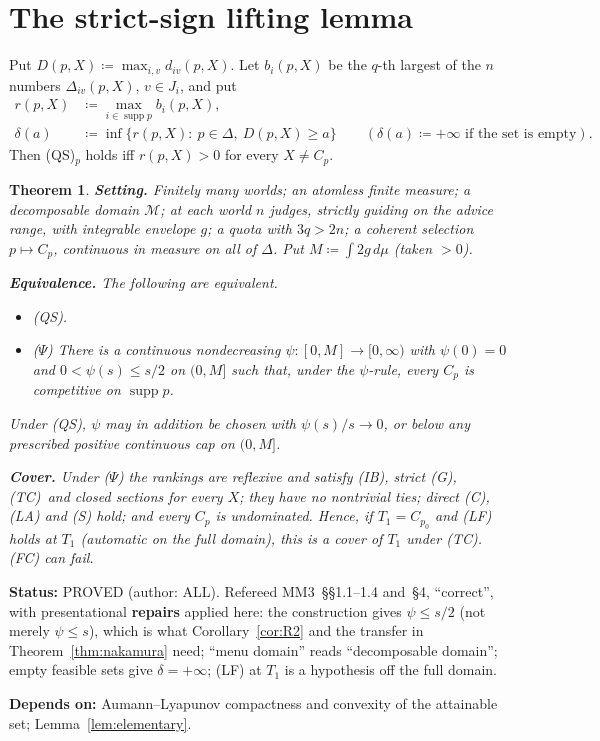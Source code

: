 \documentclass[11pt]{article}
\newtheorem{theorem}{Theorem}[section]
\theoremstyle{definition}
\theoremstyle{remark}
\newcommand{\M}{\mathcal M}
\newcommand{\supp}{\operatorname{supp}}
\newcommand{\src}[1]{\textsf{#1}}
\newcommand{\status}[1]{\par\smallskip\noindent\textbf{Status:} #1\par}
\newcommand{\deps}[1]{\noindent\textbf{Depends on:} #1\par}
\newcommand{\QS}{\textup{(QS)}}
\newcommand{\TC}{\textup{(TC)}}
\begin{document}
\section{The strict-sign lifting lemma}\label{sec:lifting}

Put $D(p,X)\coloneqq\max_{i,v}d_{iv}(p,X)$. Let $b_i(p,X)$ be the $q$-th largest of the $n$ numbers $\Delta_{iv}(p,X)$, $v\in J_i$, and put
\begin{align*}
r(p,X)&\coloneqq\max_{i\in\supp p}b_i(p,X),\\
\delta(a)&\coloneqq\inf\{r(p,X):\ p\in\Delta,\ D(p,X)\ge a\}\qquad(\delta(a)\coloneqq+\infty\text{ if the set is empty}).
\end{align*}
Then \QS$_p$ holds iff $r(p,X)>0$ for every $X\ne C_p$.

\begin{theorem}\label{thm:lifting}
\textbf{Setting.} Finitely many worlds; an atomless finite measure; a decomposable domain $\M$; at each world $n$ judges, strictly guiding on the advice range, with integrable envelope $g$; a quota with $3q>2n$; a coherent selection $p\mapsto C_p$, continuous in measure on all of $\Delta$. Put $M\coloneqq\int2g\,d\mu$ (taken $>0$).

\textbf{Equivalence.} The following are equivalent.
\begin{itemize}[leftmargin=*]
\item \QS.
\item (\(\Psi\)) There is a continuous nondecreasing $\psi:[0,M]\to[0,\infty)$ with $\psi(0)=0$ and $0<\psi(s)\le s/2$ on $(0,M]$ such that, under the $\psi$-rule, every $C_p$ is competitive on $\supp p$.
\end{itemize}
Under \QS, $\psi$ may in addition be chosen with $\psi(s)/s\to0$, or below any prescribed positive continuous cap on $(0,M]$.

\textbf{Cover.} Under (\(\Psi\)) the rankings are reflexive and satisfy (IB), strict (G), \TC\ and closed sections for every $X$; they have no nontrivial ties; direct (C), (LA) and (S) hold; and every $C_p$ is undominated. Hence, if $T_1=C_{p_0}$ and (LF) holds at $T_1$ (automatic on the full domain), this is a cover of $T_1$ under \TC. (FC) can fail.
\end{theorem}
\status{PROVED (author: \src{ALL}). Refereed \src{MM3}~\S\S1.1--1.4 and~\S4, ``correct'', with presentational \textbf{repairs} applied here: the construction gives $\psi\le s/2$ (not merely $\psi\le s$), which is what Corollary~\ref{cor:R2} and the transfer in Theorem~\ref{thm:nakamura} need; ``menu domain'' reads ``decomposable domain''; empty feasible sets give $\delta=+\infty$; (LF) at $T_1$ is a hypothesis off the full domain.}
\deps{Aumann--Lyapunov compactness and convexity of the attainable set; Lemma~\ref{lem:elementary}.}
\end{document}
